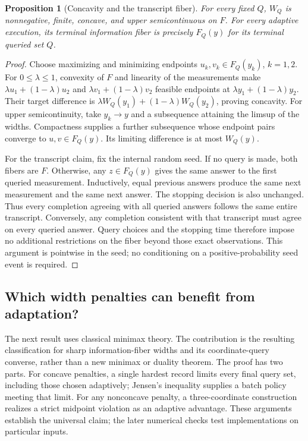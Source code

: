 \documentclass[12pt]{article}
\newtheorem{proposition}{Proposition}
\begin{document}
\begin{proposition}[Concavity and the transcript fiber]
\label{prop:risk_concavity_transcript}
For every fixed $Q$, $W_Q$ is nonnegative, finite, concave, and upper
semicontinuous on $F$. For every adaptive execution, its terminal
information fiber is precisely $F_Q(y)$ for its terminal queried set $Q$.
\end{proposition}
\begin{proof}
Choose maximizing and minimizing endpoints $u_k,v_k\in F_Q(y_k)$,
$k=1,2$. For $0\le\lambda\le1$, convexity of $F$ and linearity of the
measurements make $\lambda u_1+(1-\lambda)u_2$ and
$\lambda v_1+(1-\lambda)v_2$ feasible endpoints at
$\lambda y_1+(1-\lambda)y_2$. Their target difference is
$\lambda W_Q(y_1)+(1-\lambda)W_Q(y_2)$, proving concavity.
For upper semicontinuity, take $y_k\to y$ and a subsequence attaining
the limsup of the widths. Compactness supplies a further subsequence
whose endpoint pairs converge to $u,v\in F_Q(y)$. Its limiting
difference is at most $W_Q(y)$.

For the transcript claim, fix the internal random seed. If no query is
made, both fibers are $F$. Otherwise, any
$z\in F_Q(y)$ gives the same answer to the first queried measurement.
Inductively, equal previous answers produce the same next measurement
and the same next answer. The stopping decision is also unchanged.
Thus every completion agreeing with all queried answers follows the
same entire transcript. Conversely, any completion consistent with
that transcript must agree on every queried answer. Query choices and
the stopping time therefore impose no additional restrictions on the
fiber beyond those exact observations. This argument is pointwise in the
seed; no conditioning on a positive-probability seed event is required.
\end{proof}

\subsection{Which width penalties can benefit from adaptation?}
\label{sec:risk_classification}
The next result uses classical minimax theory. The contribution is the
resulting classification for sharp information-fiber widths and its
coordinate-query converse, rather than a new minimax or duality theorem.
The proof has two parts. For concave penalties, a single hardest record
limits every final query set, including those chosen adaptively; Jensen's
inequality supplies a batch policy meeting that limit. For any nonconcave
penalty, a three-coordinate construction realizes a strict midpoint
violation as an adaptive advantage. These arguments establish the universal
claim; the later numerical checks test implementations on particular inputs.
\end{document}
